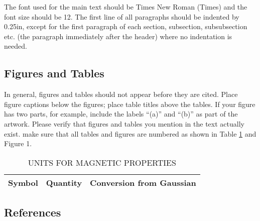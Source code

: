 \documentclass[12pt,a4paper]{article}
\begin{document}
The font used for the main text should be Times New Roman (Times) and the font size should be 12.  The first line of all paragraphs should be indented by 0.25in, except for the first paragraph of each section, subsection, subsubsection etc. (the paragraph immediately after the header) where no indentation is needed.

\subsection{Figures and Tables}
In general, figures and tables should not appear before they are cited.  Place figure captions below the figures; place table titles above the tables.  If your figure has two parts, for example, include the labels ``(a)'' and ``(b)'' as part of the artwork.  Please verify that figures and tables you mention in the text actually exist.  make sure that all tables and figures are numbered as shown in Table \ref{units} and Figure 1.

\begin{table}[htb]
\centering
\caption{UNITS FOR MAGNETIC PROPERTIES}
\vspace*{6pt}
\label{units}
\begin{tabular}{ccc}\hline\hline
Symbol & Quantity & Conversion from Gaussian \\ \hline
\end{tabular}
\end{table}

\subsection{References}




\end{document}
